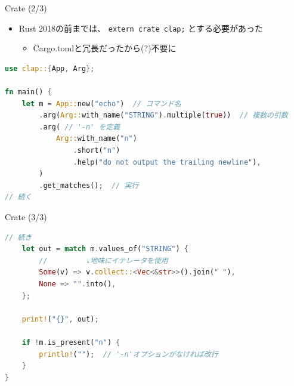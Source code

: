 \documentclass[cjk,dvipdfmx,10pt,compress,fragile%
hyperref={bookmarks=true,bookmarksnumbered=true,bookmarksopen=false,%
colorlinks=false,%
pdftitle={第 134 回 関西 Debian 勉強会},%
pdfauthor={小林},%
pdfsubject={資料},%
}]{beamer}
\begin{document}
\begin{frame}[t,fragile]{Crate (2/3)}
\begin{itemize}
 \item Rust 2018の前までは、 \verb|extern crate clap;| とする必要があった
       \begin{itemize}
	\item Cargo.tomlと冗長だったから(?)不要に
       \end{itemize}
\end{itemize}
\begin{lstlisting}[language=Rust,style=boxed,style=colouredRust,basicstyle=\small\tt,lineskip=-2pt]
use clap::{App, Arg};

fn main() {
    let m = App::new("echo")  // コマンド名
        .arg(Arg::with_name("STRING").multiple(true))  // 複数の引数
        .arg( // '-n' を定義
            Arg::with_name("n")
                .short("n")
                .help("do not output the trailing newline"),
        )
        .get_matches();  // 実行
// 続く\end{lstlisting}
\end{frame}

\begin{frame}[t,fragile]{Crate (3/3)}
\begin{lstlisting}[language=Rust,style=boxed,style=colouredRust,basicstyle=\small\tt,lineskip=-2pt]
// 続き
    let out = match m.values_of("STRING") {
        //         ↓地味にイテレータを使用
        Some(v) => v.collect::<Vec<&str>>().join(" "),
        None => "".into(),
    };

    print!("{}", out);

    if !m.is_present("n") {
        println!("");  // '-n'オプションがなければ改行
    }
}\end{lstlisting}
\end{frame}
\end{document}
